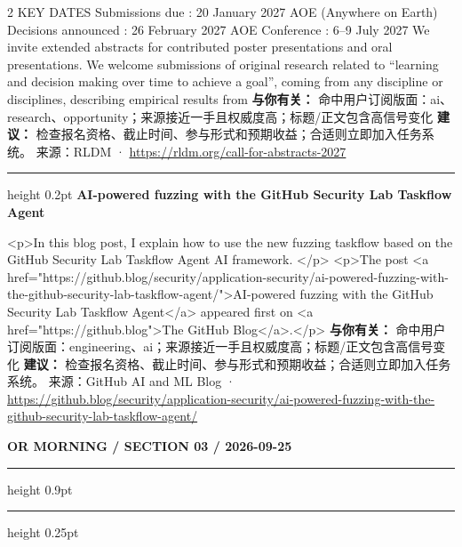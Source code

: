 \documentclass[10.5pt]{ctexart}
\begin{document}
\begin{multicols}{2}
KEY DATES Submissions due : 20 January 2027 AOE (Anywhere on Earth) Decisions announced : 26 February 2027 AOE Conference : 6–9 July 2027 We invite extended abstracts for contributed poster presentations and oral presentations. We welcome submissions of original research related to “learning and decision making over time to achieve a goal”, coming from any discipline or disciplines, describing empirical results from 
\textbf{与你有关：} 命中用户订阅版面：ai、research、opportunity；来源接近一手且权威度高；标题/正文包含高信号变化
\textbf{建议：} 检查报名资格、截止时间、参与形式和预期收益；合适则立即加入任务系统。
{\footnotesize\color{ormuted} 来源：RLDM · \url{https://rldm.org/call-for-abstracts-2027}}
\vspace{2mm}
\hrule height 0.2pt
\vspace{2mm}
{\large\bfseries AI-powered fuzzing with the GitHub Security Lab Taskflow Agent}\par
<p>In this blog post, I explain how to use the new fuzzing taskflow based on the GitHub Security Lab Taskflow Agent AI framework. </p> <p>The post <a href="https://github.blog/security/application-security/ai-powered-fuzzing-with-the-github-security-lab-taskflow-agent/">AI-powered fuzzing with the GitHub Security Lab Taskflow Agent</a> appeared first on <a href="https://github.blog">The GitHub Blog</a>.</p>
\textbf{与你有关：} 命中用户订阅版面：engineering、ai；来源接近一手且权威度高；标题/正文包含高信号变化
\textbf{建议：} 检查报名资格、截止时间、参与形式和预期收益；合适则立即加入任务系统。
{\footnotesize\color{ormuted} 来源：GitHub AI and ML Blog · \url{https://github.blog/security/application-security/ai-powered-fuzzing-with-the-github-security-lab-taskflow-agent/}}
\end{multicols}
\newpage
{\small\bfseries OR MORNING / SECTION 03 / 2026-09-25}
\vspace{2mm}
\hrule height 0.9pt
\vspace{1.5mm}
\hrule height 0.25pt
\vspace{4mm}
\end{document}
